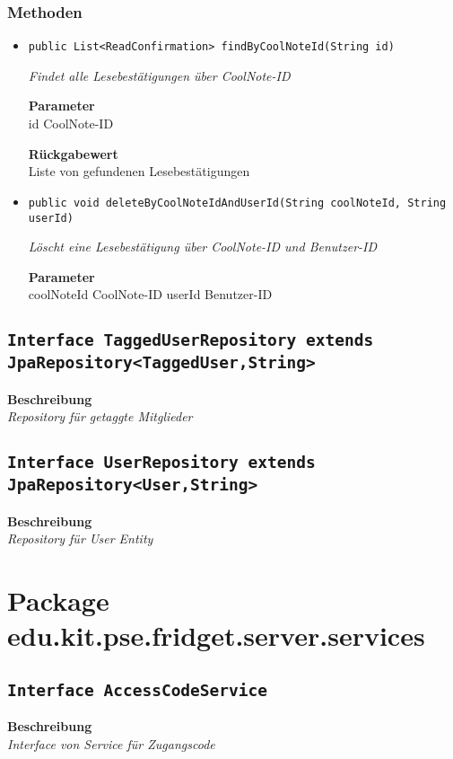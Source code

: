     \subsubsection{Methoden}
    \begin{itemize}
    	\item{\texttt{public List<ReadConfirmation> findByCoolNoteId(String id)}}
    	
    	\textit{Findet alle Lesebestätigungen über CoolNote-ID}
    	
    	\textbf{Parameter} \\
    	id CoolNote-ID
    	
    	\textbf{Rückgabewert} \\
    	Liste von gefundenen Lesebestätigungen        \item{\texttt{public void deleteByCoolNoteIdAndUserId(String coolNoteId, String userId)}}
    	
    	\textit{Löscht eine Lesebestätigung über CoolNote-ID und Benutzer-ID}
    	
    	\textbf{Parameter} \\
    	coolNoteId CoolNote-ID
    	userId Benutzer-ID
    	
    	
    \end{itemize}
    \subsection{\texttt{Interface TaggedUserRepository extends JpaRepository<TaggedUser,String>}}
    \textbf{Beschreibung} \\
    \textit{Repository für getaggte Mitglieder}
    \subsection{\texttt{Interface UserRepository extends JpaRepository<User,String>}}
    \textbf{Beschreibung} \\
    \textit{Repository für User Entity}
    \section{Package edu.kit.pse.fridget.server.services}
    \subsection{\texttt{Interface AccessCodeService}}
    \textbf{Beschreibung} \\
    \textit{Interface von Service für Zugangscode}
